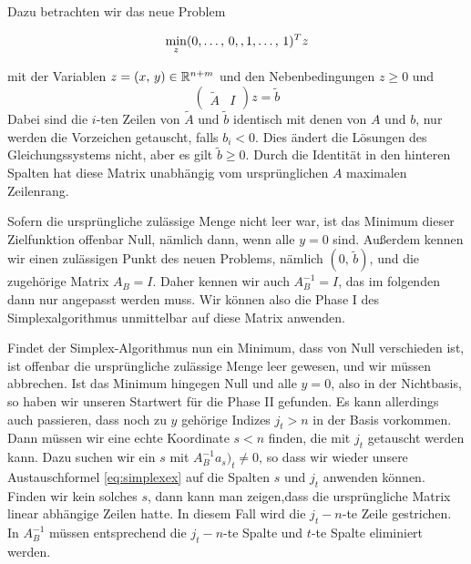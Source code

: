 Dazu betrachten wir das neue Problem
{\samepage\vspace{0.2em}\begin{equation}
  \min_z (\tikzlabel{xl}0,\ldots,\,0,\tikzlabel{xr},
  \tikzlabel{yl}1,\ldots,\,1\tikzlabel{yr})^Tz
\end{equation}
}
mit der Variablen $z=(x,\,y)\in\mathbb{R}^{n+m}$ und den Nebenbedingungen $z\ge 0$
und
\begin{equation*}
  \begin{pmatrix}
    \tilde{A} & I 
  \end{pmatrix}
  z =
  \tilde{b}
\end{equation*}
Dabei sind die $i$-ten Zeilen von $\tilde{A}$ und $\tilde{b}$
identisch mit denen von $A$ und $b$, nur werden die Vorzeichen
getauscht, falls $b_i<0$. Dies ändert die Lösungen des
Gleichungssystems nicht, aber es gilt $\tilde{b}\ge 0$. Durch die
Identität in den hinteren Spalten hat diese Matrix unabhängig vom
ursprünglichen $A$ maximalen Zeilenrang.

Sofern die ursprüngliche zulässige Menge nicht leer war, ist das
Minimum dieser Zielfunktion offenbar Null, nämlich dann, wenn alle
$y=0$ sind. Außerdem kennen wir einen zulässigen Punkt des neuen
Problems, nämlich $(0,\,\tilde{b})$, und die zugehörige Matrix
$A_B=I$.  Daher kennen wir auch $A_B^{-1}=I$, das im folgenden dann
nur angepasst werden muss. Wir können also die Phase I des
Simplexalgorithmus unmittelbar auf diese Matrix anwenden.

Findet der Simplex-Algorithmus nun ein Minimum, dass von Null
verschieden ist, ist offenbar die ursprüngliche zulässige Menge leer
gewesen, und wir müssen abbrechen. Ist das Minimum hingegen Null und
alle $y=0$, also in der Nichtbasis, so haben wir unseren Startwert für
die Phase II gefunden. Es kann allerdings auch passieren, dass noch zu
$y$ gehörige Indizes $j_t>n$ in der Basis vorkommen. Dann müssen wir
eine echte Koordinate $s<n$ finden, die mit $j_t$ getauscht werden
kann. Dazu suchen wir ein $s$ mit $A_B^{-1}a_s)_t\neq 0$, so dass wir
wieder unsere Austauschformel \eqref{eq:simplexex} auf die Spalten $s$
und $j_t$ anwenden können. Finden wir kein solches $s$, dann kann man
zeigen,dass die ursprüngliche Matrix linear abhängige Zeilen hatte. In
diesem Fall wird die $j_t-n$-te Zeile gestrichen. In $A_B^{-1}$ müssen
entsprechend die $j_t-n$-te Spalte und $t$-te Spalte eliminiert
werden.

